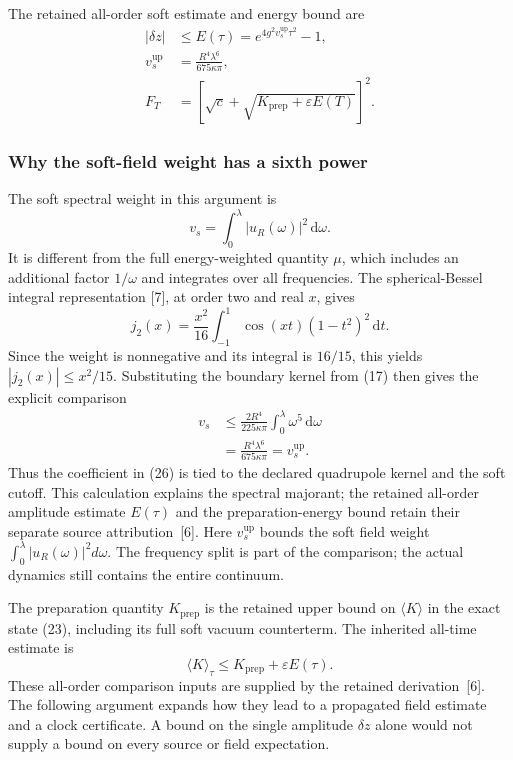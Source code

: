 \documentclass[10pt,twocolumn,letterpaper]{article}
\newcommand{\dd}{\mathrm{d}}
\begin{document}
The retained all-order soft estimate and energy bound are
\begin{equation}
\begin{aligned}
|\delta z|&\le E(\tau)=e^{4g^2v_s^{\mathrm{up}}\tau^2}-1,\\
v_s^{\mathrm{up}}&=\frac{R^4\lambda^6}{675\kappa\pi},\\
F_T&=\left[\sqrt c+\sqrt{K_{\mathrm{prep}}+\varepsilon E(T)}\right]^2.
\end{aligned}\tag{26}\label{eq:clock-soft-estimate}
\end{equation}
\subsubsection*{Why the soft-field weight has a sixth power}
The soft spectral weight in this argument is
\[
 v_s=\int_0^\lambda |u_R(\omega)|^2\,\dd\omega.
\]
It is different from the full energy-weighted quantity $\mu$, which includes an additional factor $1/\omega$ and integrates over all frequencies. The spherical-Bessel integral representation [7], at order two and real $x$, gives
\[
 j_2(x)=\frac{x^2}{16}\int_{-1}^{1}
       \cos(xt)(1-t^2)^2\,\dd t.
\]
Since the weight is nonnegative and its integral is $16/15$, this yields $|j_2(x)|\le x^2/15$. Substituting the boundary kernel from (17) then gives the explicit comparison
\[
\begin{aligned}
v_s&\le\frac{2R^4}{225\kappa\pi}
       \int_0^\lambda\omega^5\,\dd\omega\\
   &=\frac{R^4\lambda^6}{675\kappa\pi}
    =v_s^{\mathrm{up}}.
\end{aligned}
\]
Thus the coefficient in (26) is tied to the declared quadrupole kernel and the soft cutoff. This calculation explains the spectral majorant; the retained all-order amplitude estimate $E(\tau)$ and the preparation-energy bound retain their separate source attribution~[6].
Here $v_s^{\mathrm{up}}$ bounds the soft field weight $\int_0^\lambda |u_R(\omega)|^2d\omega$. The frequency split is part of the comparison; the actual dynamics still contains the entire continuum.

The preparation quantity $K_{\mathrm{prep}}$ is the retained upper bound on $\langle K\rangle$ in the exact state (23), including its full soft vacuum counterterm. The inherited all-time estimate is
\[
\langle K\rangle_\tau\le K_{\mathrm{prep}}+\varepsilon E(\tau).
\]
These all-order comparison inputs are supplied by the retained derivation~[6]. The following argument expands how they lead to a propagated field estimate and a clock certificate. A bound on the single amplitude $\delta z$ alone would not supply a bound on every source or field expectation.
\end{document}
